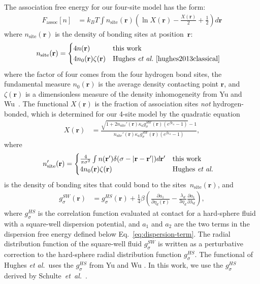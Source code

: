 \documentclass[preprint,amsmath,amssymb]{revtex4-1}
\newcommand{\rr}{\textbf{r}}
\newcommand{\xx}{\textbf{r}}
\newcommand\etadisp{\ensuremath{\eta_\textit{d}}}
\newcommand\epsilonassoc{\ensuremath{\epsilon_\textit{a}}}
\newcommand\kappaassoc{\ensuremath{\kappa_\textit{a}}}
\newcommand\lambdadisp{\ensuremath{\lambda_\textit{d}}}
\newcommand\hughesetal{Hughes \emph{et al.}}
\newcommand\hughesetalcite{Hughes \emph{et al.}~\cite{hughes2013classical}}
\begin{document}
The association free energy for our four-site model has the form:
\begin{align}
  F_\text{assoc}[n] &= k_BT \int n_\text{site}(\xx)
  \left(\ln X(\xx) - \frac{X(\xx)}{2} + \frac12\right) d\xx
\end{align}
where $n_\text{site}(\rr)$ is the density of bonding sites at
position~$\rr$:
\begin{align}
  n_\text{site}(\rr) &=
  \begin{cases}
    4 n(\rr) & \text{this work}\\
    4 n_0(\rr) \zeta(\rr) & \text{\hughesetalcite}
  \end{cases}
\end{align}
where the factor of four comes from the four hydrogen bond sites, the
fundamental measure $n_0(\rr)$ is the average density contacting point
$\rr$, and $\zeta(\xx)$ is a dimensionless measure of the density
inhomogeneity from Yu and
Wu~\cite{yu2002fmt-dft-inhomogeneous-associating}.  The functional
$X(\rr)$ is the fraction of association sites \emph{not}
hydrogen-bonded, which is determined for our 4-site model by the
quadratic equation
\begin{align}
  X(\xx) &= \frac{\sqrt{1 + 2n_\text{site}'(\rr)
      \kappaassoc g^\textit{SW}_\sigma(\xx)
  \left(e^{\beta\epsilonassoc} - 1\right)} - 1}
  {n_\text{site}'(\rr)
    \kappaassoc g^\textit{SW}_\sigma(\xx)
  \left(e^{\beta\epsilonassoc} - 1\right)}, \label{eq:X}
\end{align}
where
\begin{align}
  n_\text{site}'(\rr) &=
  \begin{cases}
    \frac{4}{\pi\sigma^2} \int n(\rr')\delta(\sigma - |\rr-\rr'|) d\rr' & \text{this work}\\
    4 n_0(\rr) \zeta(\rr) & \text{\hughesetal}
  \end{cases} 
\end{align}
is the density of bonding sites that could bond to the sites~$n_\text{site}(\rr)$, and
\begin{align}
  g^\textit{SW}_\sigma(\xx) &= g^\textit{HS}_\sigma(\xx) +
  \frac{1}{4}\beta\left(\frac{\partial a_1}{\partial \etadisp(\xx)} -
  \frac{\lambdadisp}{3 \etadisp}\frac{\partial a_1}{\partial \lambdadisp}\right)\label{eq:gSW},
\end{align}
where $g^\textit{HS}_\sigma$ is the correlation function evaluated at
contact for a hard-sphere fluid with a square-well dispersion
potential, and $a_1$ and $a_2$ are the two terms in the dispersion
free energy defined below Eq.~\ref{eq:dispersion-term}.  The radial distribution function of the square-well
fluid $g^\textit{SW}_\sigma$ is written as a perturbative correction
to the hard-sphere radial distribution function
$g^\textit{HS}_\sigma$.  The functional of \hughesetal\ uses the
$g_\sigma^\textit{HS}$ from Yu and Wu
\cite{yu2002fmt-dft-inhomogeneous-associating}.  In this work, we use
the $g_\sigma^\textit{HS}$ derived by Schulte~\emph{et~al.}~\cite{schulte2012using}.
\end{document}
